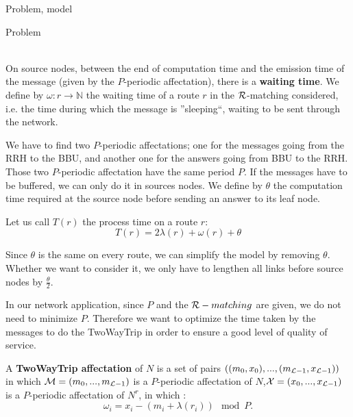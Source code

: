 \documentclass[a4paper,10pt]{report}
\begin{document}
\begin{chapter}{Problem, model}
\begin{section}{Problem}
{{\begin{center}
{
}
\end{center}}}\\

On source nodes, between the end of computation time and the emission time of the message (given by the $P$-periodic affectation), there is a {\bf waiting time}. 
We define by $\omega : r \rightarrow \mathbb{N}$ the waiting time of a route $r$ in the ${\cal R}$-matching considered, i.e. the time during which the
message is ''sleeping``, waiting to be sent through the network.


We have to find two $P$-periodic affectations; one for the messages going from the RRH to the BBU, and another one for the answers going from BBU to the RRH. Those two $P$-periodic affectation have the same period $P$. 
If the messages have to be buffered, we can only do it in sources nodes.
We define by $\theta$ the computation time required at the source node before sending an answer to its leaf node.

Let us call $T (r)$ the process time on a route $r$: $$ T (r) = 2\lambda (r) + \omega (r) + \theta$$

Since $\theta$ is the same on every route, we can simplify the model by removing $\theta$. Whether we want to consider it, we only have to lengthen all 
links before source nodes by $\frac{\theta}{2}$. 


In our network application, since $P$ and the ${\cal R}-matching$ are given, we do not need to minimize $P$.
Therefore we want to optimize the time taken by the messages to do the TwoWayTrip in order to ensure a good level of quality of service.

A {\bf TwoWayTrip affectation} of $N$ is a set of pairs $ ((m_0,x_0),...,(m_{{\cal L}-1},x_{{\cal L}-1}))$ in which ${\cal M} = (m_0,...,m_{{\cal L}-1})$ 
is a $P$-periodic affectation of $N$,${\cal X} = (x_0,...,x_{{\cal L}-1})$ is a $P$-periodic affectation of $N^r$, in which :
$$ \omega_i = x_i - (m_i + \lambda(r_i)) \mod P .$$ 


\end{section}
\end{chapter}
\end{document}
